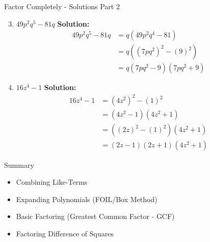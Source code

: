\documentclass[aspectratio=169]{beamer}
\begin{document}
\begin{frame}{Factor Completely - Solutions Part 2}
    \begin{tcolorbox}[colback=lightgray,colframe=accent,title=Detailed Solutions]
        \footnotesize
        \begin{enumerate}
            \setcounter{enumi}{2}
            \setlength{\itemsep}{0.5em}
            \item $49p^2q^5 - 81q$
            \quad \textbf{Solution:}
            \begin{align*}
                49p^2q^5 - 81q &= q(49p^2q^4 - 81) \\
                &= q((7pq^2)^2 - (9)^2) \\
                &= q(7pq^2 - 9)(7pq^2 + 9)
            \end{align*}
            \item $16z^4 - 1$
            \quad \textbf{Solution:}
            \begin{align*}
                16z^4 - 1 &= (4z^2)^2 - (1)^2 \\
                &= (4z^2 - 1)(4z^2 + 1) \\
                &= ((2z)^2 - (1)^2)(4z^2 + 1) \\
                &= (2z - 1)(2z + 1)(4z^2 + 1)
            \end{align*}
        \end{enumerate}
    \end{tcolorbox}
\end{frame}

\begin{frame}{Summary}
    \begin{tcolorbox}[colback=lightgray,colframe=primary,title=Key Concepts]
        \footnotesize
        \begin{itemize}
            \item Combining Like-Terms
            \item Expanding Polynomials (FOIL/Box Method)
            \item Basic Factoring (Greatest Common Factor - GCF)
            \item Factoring Difference of Squares
        \end{itemize}
    \end{tcolorbox}
\end{frame}
\end{document}
